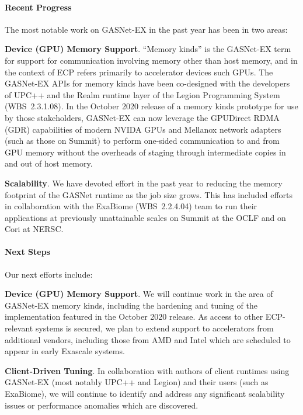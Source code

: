 \paragraph{Recent Progress}

The most notable work on GASNet-EX in the past year has been in two areas:

\textbf{Device (GPU) Memory Support}.
``Memory kinds'' is the GASNet-EX term for support for communication involving
memory other than host memory, and in the context of ECP refers primarily to
accelerator devices such GPUs.
The GASNet-EX APIs for memory kinds have been co-designed with the developers
of UPC++ and the Realm runtime layer of the Legion Programming System
(WBS~2.3.1.08).  In the October 2020 release of a memory kinds prototype for
use by those stakeholders, GASNet-EX can now leverage the GPUDirect RDMA (GDR)
capabilities of modern NVIDA GPUs and Mellanox network adapters (such as those
on Summit) to perform one-sided communication to and from GPU memory without
the overheads of staging through intermediate copies in and out of host memory.

\textbf{Scalability}.
We have devoted effort in the past year to reducing the memory footprint of the
GASNet runtime as the job size grows.  This has included efforts in
collaboration with the ExaBiome (WBS~2.2.4.04) team to run their applications
at previously unattainable scales on Summit at the OCLF and on Cori at NERSC.

\paragraph{Next Steps}

Our next efforts include:

\textbf{Device (GPU) Memory Support}.
We will continue work in the area of GASNet-EX memory kinds, including the
hardening and tuning of the implementation featured in the October 2020
release.  As access to other ECP-relevant systems is secured, we plan to extend
support to accelerators from additional vendors, including those from AMD and
Intel which are scheduled to appear in early Exascale systems.

\textbf{Client-Driven Tuning}.
In collaboration with authors of client runtimes using GASNet-EX (most notably
UPC++ and Legion) and their users (such as ExaBiome), we will continue to
identify and address any significant scalability issues or performance
anomalies which are discovered.

\clearpage
